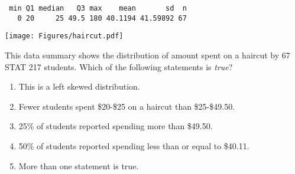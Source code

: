 \begin{frame}[fragile]
\begin{verbatim}
 min Q1 median   Q3 max    mean       sd  n
   0 20     25 49.5 180 40.1194 41.59892 67
\end{verbatim}
\texttt{[image: Figures/haircut.pdf]}
\begin{clicker}{This data summary shows the distribution of amount spent on a haircut by 67 STAT 217 students.  Which of the following statements is \emph{true}?}
    \begin{enumerate}
      \item
      This is a left skewed distribution.
      \item
      Fewer students spent \$20-\$25 on a haircut than \$25-\$49.50.
      \item
      25\% of students reported spending more than \$49.50.
      \item
      50\% of students reported spending less than or equal to \$40.11.
      \item
      More than one statement is true.
    \end{enumerate}
\end{clicker}
\end{frame}



